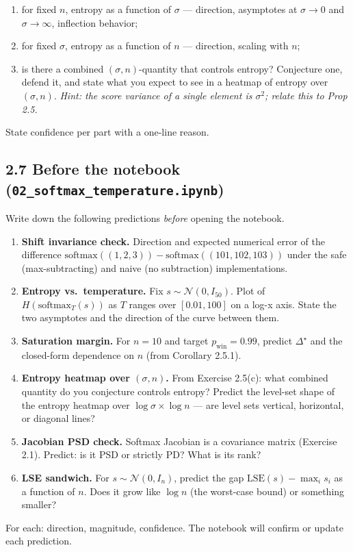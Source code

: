 \documentclass[
]{article}
\providecommand{\tightlist}{%
  \setlength{\itemsep}{0pt}\setlength{\parskip}{0pt}}
\begin{document}
\begin{enumerate}
\def\labelenumi{(\alph{enumi})}
\item
  for fixed \(n\), entropy as a function of \(\sigma\) --- direction,
  asymptotes at \(\sigma \to 0\) and \(\sigma \to \infty\), inflection
  behavior;
\item
  for fixed \(\sigma\), entropy as a function of \(n\) --- direction,
  scaling with \(n\);
\item
  is there a combined \((\sigma, n)\)-quantity that controls entropy?
  Conjecture one, defend it, and state what you expect to see in a
  heatmap of entropy over \((\sigma, n)\). \emph{Hint: the score
  variance of a single element is \(\sigma^2\); relate this to Prop
  2.5.}
\end{enumerate}

State confidence per part with a one-line reason.

\hypertarget{before-the-notebook-02_softmax_temperature.ipynb}{%
\subsection{\texorpdfstring{2.7 Before the notebook
(\texttt{02\_softmax\_temperature.ipynb})}{2.7 Before the notebook (02\_softmax\_temperature.ipynb)}}\label{before-the-notebook-02_softmax_temperature.ipynb}}

Write down the following predictions \emph{before} opening the notebook.

\begin{enumerate}
\def\labelenumi{\arabic{enumi}.}
\tightlist
\item
  \textbf{Shift invariance check.} Direction and expected numerical
  error of the difference
  \(\text{softmax}((1, 2, 3)) - \text{softmax}((101, 102, 103))\) under
  the safe (max-subtracting) and naive (no subtraction) implementations.
\item
  \textbf{Entropy vs.~temperature.} Fix
  \(s \sim \mathcal{N}(0, I_{50})\). Plot of \(H(\text{softmax}_T(s))\)
  as \(T\) ranges over \([0.01, 100]\) on a log-x axis. State the two
  asymptotes and the direction of the curve between them.
\item
  \textbf{Saturation margin.} For \(n = 10\) and target
  \(p_{\text{win}} = 0.99\), predict \(\Delta^\star\) and the
  closed-form dependence on \(n\) (from Corollary 2.5.1).
\item
  \textbf{Entropy heatmap over \((\sigma, n)\).} From Exercise 2.5(c):
  what combined quantity do you conjecture controls entropy? Predict the
  level-set shape of the entropy heatmap over
  \(\log \sigma \times \log n\) --- are level sets vertical, horizontal,
  or diagonal lines?
\item
  \textbf{Jacobian PSD check.} Softmax Jacobian is a covariance matrix
  (Exercise 2.1). Predict: is it PSD or strictly PD? What is its rank?
\item
  \textbf{LSE sandwich.} For \(s \sim \mathcal{N}(0, I_n)\), predict the
  gap \(\text{LSE}(s) - \max_i s_i\) as a function of \(n\). Does it
  grow like \(\log n\) (the worst-case bound) or something smaller?
\end{enumerate}

For each: direction, magnitude, confidence. The notebook will confirm or
update each prediction.
\end{document}
